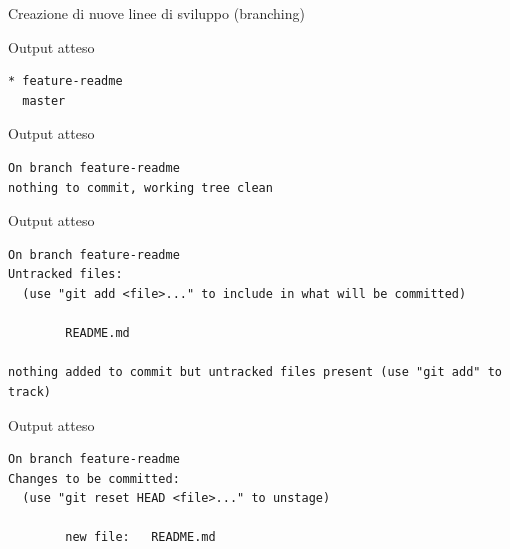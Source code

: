 \documentclass[xcolor=dvipsnames,presentation]{beamer}
\begin{document}
\begin{frame}{Creazione di nuove linee di sviluppo (branching)}
\begin{block}{Output atteso}
        \begin{Verbatim}[fontsize=\scriptsize]
* feature-readme
  master
        \end{Verbatim}
    \end{block}
    \begin{block}{Output atteso}
        \begin{Verbatim}[fontsize=\scriptsize]
On branch feature-readme
nothing to commit, working tree clean
        \end{Verbatim}
    \end{block}
    \begin{block}{Output atteso}
        \begin{Verbatim}[fontsize=\scriptsize]
On branch feature-readme
Untracked files:
  (use "git add <file>..." to include in what will be committed)

        README.md

nothing added to commit but untracked files present (use "git add" to track)
        \end{Verbatim}
    \end{block}
    \begin{block}{Output atteso}
        \begin{Verbatim}[fontsize=\scriptsize]
On branch feature-readme
Changes to be committed:
  (use "git reset HEAD <file>..." to unstage)

        new file:   README.md


\end{Verbatim}
\end{block}
\end{frame}
\end{document}
